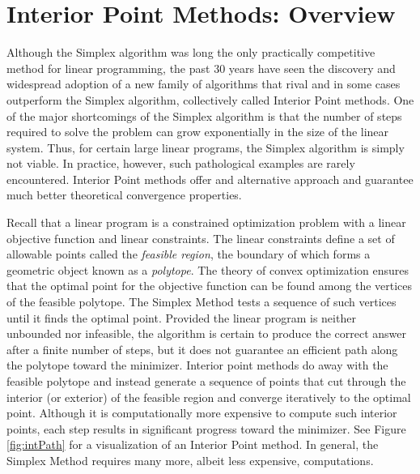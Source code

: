 
\section*{Interior Point Methods: Overview}
Although the Simplex algorithm was long the only practically competitive method for linear programming, the past 30 years have seen the discovery and widespread adoption of a new family of algorithms that rival and in some cases outperform the Simplex algorithm, collectively called Interior Point methods. One of the major shortcomings of the Simplex algorithm is that the number of steps required to solve the problem can grow exponentially in the size of the linear system. Thus, for certain large linear programs, the Simplex algorithm is simply not viable. In practice, however, such pathological examples are rarely encountered. Interior Point methods offer and alternative approach and guarantee much better theoretical convergence properties.

Recall that a linear program is a constrained optimization problem with a linear objective function and linear constraints.
The linear constraints define a set of allowable points called the \emph{feasible region}, the boundary of which forms a geometric
object known as a \emph{polytope}. The theory of convex optimization ensures that the optimal point for the objective function
can be found among the vertices of the feasible polytope. The Simplex Method tests a sequence of such vertices until it finds
the optimal point. Provided the linear program is neither unbounded nor infeasible, the algorithm is certain to produce the correct
answer after a finite number of steps, but it does not guarantee an efficient path along the polytope toward the minimizer. Interior point methods do away with the feasible polytope and instead generate a sequence of points that cut through the interior (or
exterior) of the feasible region and converge iteratively to the optimal point. Although it is computationally more expensive to
compute such interior points, each step results in significant progress toward the minimizer. See Figure \ref{fig:intPath} for
a visualization of an Interior Point method. In general, the Simplex Method requires many more, albeit less expensive, computations.

